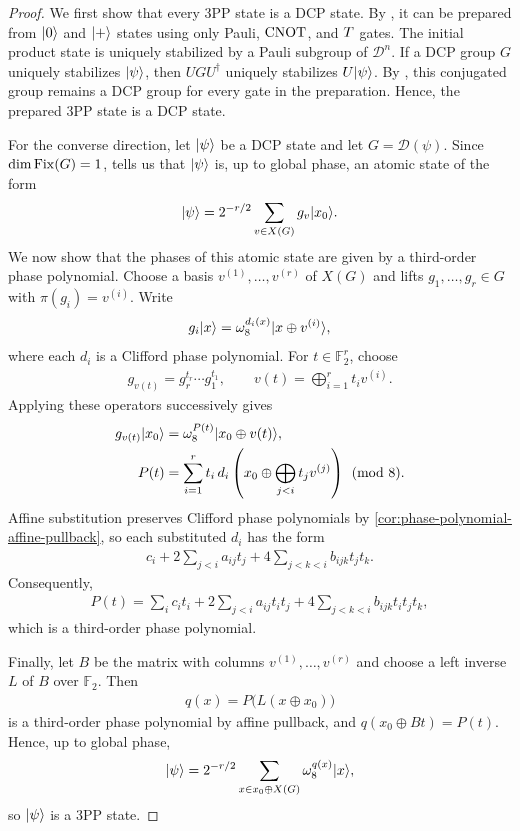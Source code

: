 \begin{proof}
We first show that every 3PP state is a DCP state. By , it can be prepared from $|0\rangle$ and $|+\rangle$ states using only Pauli, $\operatorname{CNOT}$, and $T$ gates. The initial product state is uniquely stabilized by a Pauli subgroup of $\mathcal D^n$. If a DCP group $G$ uniquely stabilizes $|\psi\rangle$, then $UGU^\dagger$ uniquely stabilizes $U|\psi\rangle$. By , this conjugated group remains a DCP group for every gate in the preparation. Hence, the prepared 3PP state is a DCP state.

For the converse direction, let $|\psi\rangle$ be a DCP state and let $G = \mathcal{D}(\psi)$. Since $\dim \operatorname{Fix}(G) = 1$,  tells us that $|\psi\rangle$ is, up to global phase, an atomic state of the form
\begin{align}
    |\psi\rangle = 2^{-r/2}\sum_{v \in X(G)} g_{v} |x_0\rangle.
\end{align}
We now show that the phases of this atomic state are given by a third-order phase polynomial.
Choose a basis $v^{(1)},\ldots,v^{(r)}$ of $X(G)$ and lifts $g_1,\ldots,g_r\in G$ with $\pi(g_i)=v^{(i)}$.
Write
\begin{align}
    g_i|x\rangle=\omega_8^{d_i(x)}|x\oplus v^{(i)}\rangle,
\end{align}
where each $d_i$ is a Clifford phase polynomial.
For $t\in\mathbb F_2^r$, choose
\begin{align}
    g_{v(t)}=g_r^{t_r}\cdots g_1^{t_1},
    \qquad
    v(t)=\bigoplus_{i=1}^r t_i v^{(i)}.
\end{align}
Applying these operators successively gives
\begin{align}
    g_{v(t)}|x_0\rangle
    &=\omega_8^{P(t)}|x_0\oplus v(t)\rangle,\\
    P(t)
    &=\sum_{i=1}^r t_i\,d_i\left(x_0\oplus\bigoplus_{j<i}t_jv^{(j)}\right)\pmod 8.
\end{align}
Affine substitution preserves Clifford phase polynomials by \cref{cor:phase-polynomial-affine-pullback}, so each substituted $d_i$ has the form
\begin{align}
    c_i+2\sum_{j<i}a_{ij}t_j+4\sum_{j<k<i}b_{ijk}t_jt_k.
\end{align}
Consequently,
\begin{align}
    P(t)=\sum_i c_it_i+2\sum_{j<i}a_{ij}t_it_j+4\sum_{j<k<i}b_{ijk}t_it_jt_k,
\end{align}
which is a third-order phase polynomial.

Finally, let $B$ be the matrix with columns $v^{(1)},\ldots,v^{(r)}$ and choose a left inverse $L$ of $B$ over $\mathbb F_2$.
Then
\begin{align}
    q(x)=P\bigl(L(x\oplus x_0)\bigr)
\end{align}
is a third-order phase polynomial by affine pullback, and $q(x_0\oplus Bt)=P(t)$.
Hence, up to global phase,
\begin{align}
    |\psi\rangle=2^{-r/2}\sum_{x\in x_0\oplus X(G)}\omega_8^{q(x)}|x\rangle,
\end{align}
so $|\psi\rangle$ is a 3PP state.
\end{proof}

